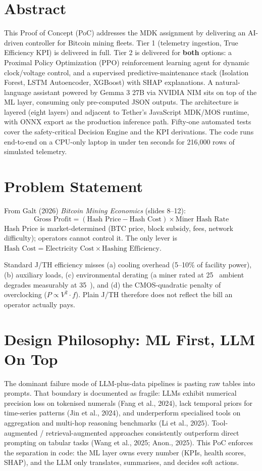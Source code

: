 \documentclass[11pt,a4paper]{article}
\begin{document}
\setcounter{page}{1}

\section*{Abstract}
This Proof of Concept (PoC) addresses the MDK assignment by delivering an
AI-driven controller for Bitcoin mining fleets. Tier 1 (telemetry ingestion,
True Efficiency KPI) is delivered in full. Tier 2 is delivered for
\textbf{both} options: a Proximal Policy Optimization (PPO) reinforcement
learning agent for dynamic clock/voltage control, and a supervised
predictive-maintenance stack (Isolation Forest, LSTM Autoencoder, XGBoost)
with SHAP explanations. A natural-language assistant powered by Gemma 3 27B
via NVIDIA NIM sits on top of the ML layer, consuming only
pre-computed JSON outputs. The architecture is layered (eight layers) and
adjacent to Tether's JavaScript MDK/MOS runtime, with ONNX export as the
production inference path. Fifty-one automated tests cover the
safety-critical Decision Engine and the KPI derivations. The code runs
end-to-end on a CPU-only laptop in under ten seconds for 216{,}000 rows of
simulated telemetry.

\section{Problem Statement}
From Galt (2026) \emph{Bitcoin Mining Economics} (slides 8--12):
\[
\text{Gross Profit} = (\text{Hash Price} - \text{Hash Cost}) \times \text{Miner Hash Rate}
\]
Hash Price is market-determined (BTC price, block subsidy, fees, network
difficulty); operators cannot control it. The only lever is
$\text{Hash Cost} = \text{Electricity Cost} \times \text{Hashing Efficiency}$.

Standard J/TH efficiency misses (a) cooling overhead (5--10\% of facility
power), (b) auxiliary loads, (c) environmental derating (a miner rated at
25~\textcelsius{} ambient degrades measurably at 35~\textcelsius), and
(d) the CMOS-quadratic penalty of overclocking ($P \propto V^2 \cdot f$).
Plain J/TH therefore does not reflect the bill an operator actually pays.

\section{Design Philosophy: ML First, LLM On Top}
The dominant failure mode of LLM-plus-data pipelines is pasting raw tables
into prompts. That boundary is documented as fragile: LLMs exhibit numerical
precision loss on tokenised numerals (Fang et al., 2024), lack temporal
priors for time-series patterns (Jin et al., 2024), and underperform
specialised tools on aggregation and multi-hop reasoning benchmarks
(Li et al., 2025). Tool-augmented / retrieval-augmented approaches
consistently outperform direct prompting on tabular tasks
(Wang et al., 2025; Anon., 2025). This PoC enforces the separation in
code: the ML layer owns every number (KPIs, health scores, SHAP), and the
LLM only translates, summarises, and decides soft actions.
\end{document}
